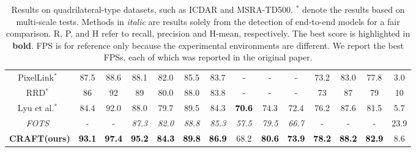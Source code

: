 \documentclass[10pt,twocolumn,letterpaper]{article}
\begin{document}
\begin{table*}[t!]
\begin{tabular}{c||c|c|c||c|c|c||c|c|c||c|c|c||c}
    PixelLink$^*$~\cite{deng2018pixellink} & 87.5 & 88.6 & 88.1 & 82.0 & 85.5 & 83.7 & - & - & - & 73.2 &  83.0 &	77.8 &	3.0 \\
    RRD$^*$~\cite{liao2018rotation} & 86 & 92 & 89 & 80.0 & 88.0 & 83.8 & - & - & - & 73 & 87 & 79 & 10\\ 
    Lyu et al.$^*$~\cite{lyu2018multi} & 84.4 & 92.0 & 88.0 & 79.7 & 89.5 & 84.3 & \textcolor{black}{\textbf{70.6}} & 74.3 & 72.4 & 76.2 & 87.6 & 81.5 & 5.7\\ 
    \textit{FOTS}~\cite{liu2018fots} & - & - & \textit{87.3} & \textit{82.0} & \textit{88.8} & \textit{85.3} & \textit{57.5} & \textit{79.5} & \textit{66.7} & - & - & - & 23.9\\ 
\hline
    \hline
    \rule{0pt}{10pt} \textbf{CRAFT(ours)} & \textcolor{black}{\textbf{93.1}} & \textcolor{black}{\textbf{97.4}} & \textcolor{black}{\textbf{95.2}} & \textcolor{black}{\textbf{84.3}} & \textcolor{black}{\textbf{89.8}} & \textcolor{black}{\textbf{86.9}} & 68.2 & \textcolor{black}{\textbf{80.6}} & \textcolor{black}{\textbf{73.9}} & \textcolor{black}{\textbf{78.2}} & \textcolor{black}{\textbf{88.2}} & \textcolor{black}{\textbf{82.9}} & 8.6\\
    \hline
  \end{tabular}
  \vspace{3mm}
  \caption{Results on quadrilateral-type datasets, such as ICDAR and MSRA-TD500. $^*$ denote the results based on multi-scale tests. Methods in \textit{italic} are results solely from the detection of end-to-end models for a fair comparison. R, P, and H refer to recall, precision and H-mean, respectively. The best score is highlighted in \textbf{bold}. FPS is for reference only because the experimental environments are different. We report the best FPSs, each of which was reported in the original paper.}
  \label{tab:result_icdar}
\end{table*}
\end{document}
